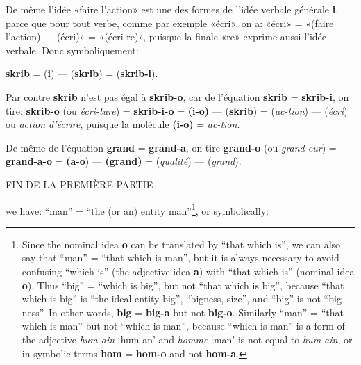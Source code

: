 \begin{sloppypar}
{\begin{minipage}[t]{\linewidth}
{{  De même l’idée «faire l'action» est une des formes de l’idée verbale
  générale \textbf{i}, parce que pour tout verbe, comme par exemple
  «écri», on a: «écri» = «(faire l’action) — (écri)» = «(écri-re)»,
  puisque la finale «re» exprime aussi l’idée verbale. Donc
  symboliquement:

  \begin{center}
    \textbf{skrib} = (\textbf{i}) — (\textbf{skrib}) =
    (\textbf{skrib-i}).
  \end{center}


  Par contre \textbf{skrib} n’est pas égal à \textbf{skrib-o}, car de
  l’équation \textbf{skrib} = \textbf{skrib-i}, on tire:
  \textbf{skrib-o} (ou \emph{écri-ture}) = \textbf{skrib-i-o} =
  \textbf{(i-o)} — (\textbf{skrib}) = (\emph{ac-tion}) — (\emph{écri})
  ou \emph{action d'écrire}, puisque la molécule \textbf{(i-o)} =
  \emph{ac-tion}.

  De même de l'équation \textbf{grand} = \textbf{grand-a}, on tire
  \textbf{grand-o} (ou \emph{grand-eur}) = \textbf{grand-a-o} =
  \textbf{(a-o}) — \textbf{(grand)} = (\emph{qualité}) —
  (\emph{grand}).  } }
\end{minipage}

\begin{center}
  FIN DE LA PREMIÈRE PARTIE
\end{center}
}
%
{\noindent
  \begin{minipage}[t]{\linewidth}
    \setcounter{mpfootnote}{\value{footnote}}
    \renewcommand{\thempfootnote}{\arabic{mpfootnote}}%
    {\noindent
      {\small we have: ``man'' = ``the (or an) entity
        man''\footnote{Since the nominal idea \textbf{o} can be
          translated by ``that which is'', we can also say that
          ``man'' = ``that which is man'', but it is always necessary
          to avoid confusing ``which is'' (the adjective idea
          \textbf{a}) with ``that which is'' (nominal idea
          \textbf{o}). Thus ``big'' = ``which is big'', but not ``that
          which is big'', because ``that which is big'' is ``the ideal
          entity big'', ``bigness, size'', and ``big'' is not
          ``big-ness''. In other words, \textbf{big} = \textbf{big-a}
          but not \textbf{big-o}. Similarly ``man'' = ``that which is
          man'' but not ``which is man'', because ``which is man'' is
          a form of the adjective \emph{hum-ain} `hum-an' and \emph{homme}
          `man' is not equal to \emph{hum-ain}, or in symbolic terms
          \textbf{hom} = \textbf{hom-o} and not \textbf{hom-a}.}, or
        symbolically:
        
}}
\end{minipage}}
\end{sloppypar}
